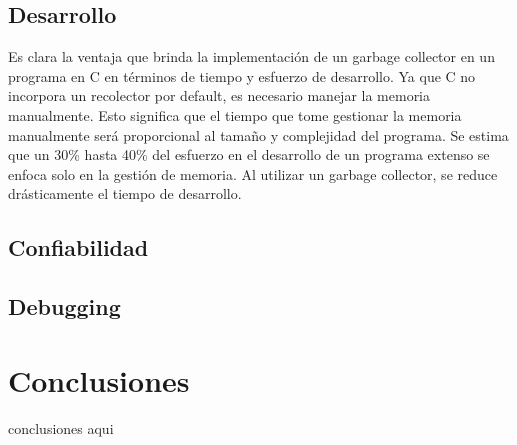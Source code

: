 \documentclass[11pt]{article} %
\begin{document}
\subsection{Desarrollo}
	Es clara la ventaja que brinda la implementación de un garbage collector en un programa en C en términos de tiempo y esfuerzo de desarrollo. Ya que C no incorpora un recolector por default, es necesario manejar la memoria manualmente. Esto significa que el tiempo que tome gestionar la memoria manualmente será proporcional al tamaño y complejidad del programa. Se estima que un 30\% hasta 40\% del esfuerzo en el desarrollo de un programa extenso se enfoca solo en la gestión de memoria. Al utilizar un garbage collector, se reduce drásticamente el tiempo de desarrollo.
\subsection{Confiabilidad}
\subsection{Debugging}

\section{Conclusiones}

conclusiones aqui
\end{document}
